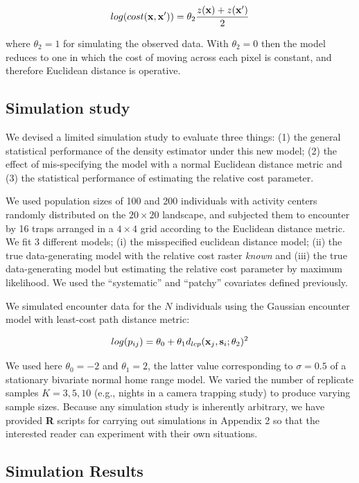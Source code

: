 \documentclass[12pt]{article}
\begin{document}
\begin{spacing}{1.8}
\[
 log(cost({\bf x},{\bf x}'))=  \theta_2 \frac{z({\bf x}) + z({\bf x}')}{2}
\]

{\flushleft where} $\theta_2 = 1$ for simulating the observed data.
 With $\theta_2=0$ then the
model reduces to one in which the cost of moving across each pixel is
constant, and therefore Euclidean distance is operative.

\subsection{Simulation study}

We devised a limited simulation study to evaluate three things: (1)
the general statistical performance of the density estimator under
this new model; (2) the effect of mis-specifying the model with a
normal Euclidean distance metric and (3) the statistical performance
of estimating the relative cost parameter.

We used population sizes of 100 and 200 individuals with activity
centers randomly distributed on the $20 \times 20$ landscape, and subjected them
to encounter by 16 traps arranged in a $4\times 4$ grid according to
the Euclidean distance metric. We fit 3 different models; (i) the
misspecified euclidean distance model; (ii) the true data-generating
model with the relative cost raster {\it known} and (iii) the true
data-generating model but estimating the relative cost parameter by
maximum likelihood.  We used the ``systematic'' and ``patchy''
covariates defined previously.

We simulated encounter data for the $N$ individuals using the Gaussian
encounter model with least-cost path distance metric:

\[
log(p_{ij})= \theta_{0} + \theta_{1} d_{lcp}({\bf x}_{j},{\bf
  s}_{i}; \theta_{2})^{2}
\]

{\flushleft We } used here $\theta_{0} = -2$ and $\theta_{1} = 2$, the latter value
corresponding to $\sigma = 0.5$ of a stationary bivariate normal home
range model.  We varied the number of replicate samples $K=3,5,10$
(e.g., nights in a camera trapping study) to produce varying sample
sizes.  Because any simulation study is inherently arbitrary, we have
provided {\bf R} scripts for carrying out simulations in Appendix 2 so
that the interested reader can experiment with their own situations.




\subsection{Simulation Results}


\end{spacing}
\end{document}
